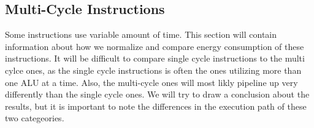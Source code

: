\subsection{Multi-Cycle Instructions}
Some instructions use variable amount of time. This section will contain
information about how we normalize and compare energy consumption of
these instructions. It will be difficult to compare single cycle instructions
to the multi cylce ones, as the single cycle instructions is often the ones
utilizing more than one ALU at a time. Also, the multi-cycle ones will most
likly pipeline up very differently than the single cycle ones. We will try to
draw a conclusion about the results, but it is important to note the differences
in the execution path of these two categeories.
